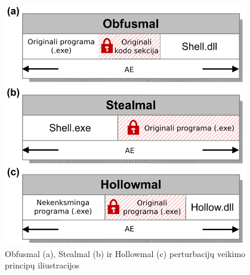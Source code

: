 \begin{figure}[h]
    \begin{small}
        \begin{center}
            \includegraphics[width=0.95\textwidth]{img/complex-perturbations.png}
        \end{center}
        \caption{Obfusmal (a), Stealmal (b) ir Hollowmal (c) perturbacijų veikimo principų iliustracijos \cite{zhongReinforcementLearningBased2022}}\label{fig:perturbations}
    \end{small}
\end{figure}